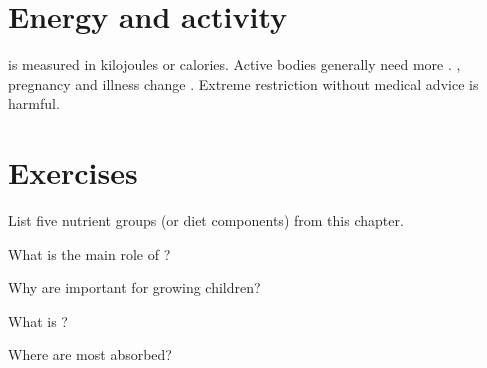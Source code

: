 \section{Energy and activity}

\begin{definition}\label{def:g6:nutrition:energy}
  is measured in kilojoules or calories. Active bodies
generally need more . , pregnancy and illness change .
Extreme restriction without medical advice is harmful.
\end{definition}

\section{Exercises}

\begin{exercise}[$\star$]\label{exo:g6:nutrition:1}
List five nutrient groups (or diet components) from this chapter.
\end{exercise}

\begin{exercise}[$\star$]\label{exo:g6:nutrition:2}
What is the main role of ?
\end{exercise}

\begin{exercise}[$\star$]\label{exo:g6:nutrition:3}
Why are  important for growing children?
\end{exercise}

\begin{exercise}[$\star$]\label{exo:g6:nutrition:4}
What is ?
\end{exercise}

\begin{exercise}[$\star\star$]\label{exo:g6:nutrition:5}
Where are most  absorbed?
\end{exercise}

